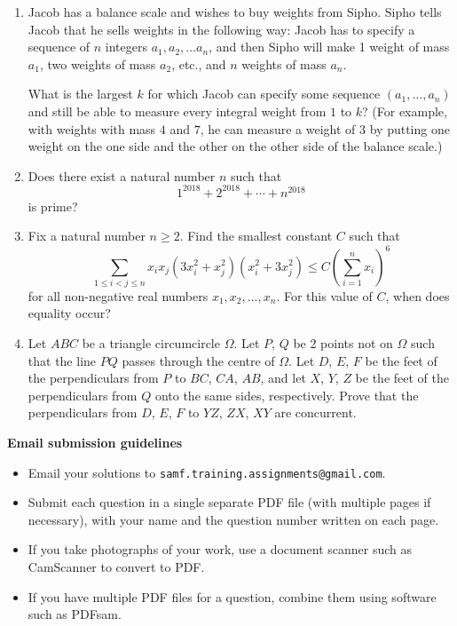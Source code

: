 \documentclass{article}
\begin{document}
\begin{enumerate}[1.]
\vspace{6pt}
\item %
Jacob has a balance scale and wishes to buy weights from Sipho. Sipho tells Jacob that he sells weights in the following way: Jacob has to specify a sequence of $n$ integers $a_1, a_2, \dotsc a_n$, and then Sipho will make 1 weight of mass $a_1$, two weights of mass $a_2$, etc., and $n$ weights of mass $a_n$.

What is the largest $k$ for which Jacob can specify some sequence $(a_1, \dotsc, a_n)$ and still be able to measure every integral weight from $1$ to $k$? (For example, with weights with mass $4$ and $7$, he can measure a weight of $3$ by putting one weight on the one side and the other on the other side of the balance scale.)


\vspace{6pt}
\item
Does there exist a natural number $n$ such that
\[
	1^{2018} + 2^{2018} + \cdots + n^{2018}
\]
is prime?


\vspace{6pt}
\item %
Fix a natural number $n \geq 2$. Find the smallest constant $C$ such that
\[
	 \sum_{1 \leq i < j \leq n} x_i x_j (3x_i^2 + x_j^2)(x_i^2 + 3x_j^2) \leq C {\left( \sum_{i = 1}^{n} x_i \right)}^6
\]
for all non-negative real numbers $x_1, x_2, \dots, x_n$. For this value of $C$, when does equality occur?


\item Let $ABC$ be a triangle circumcircle $\Omega$. Let $P$, $Q$ be 2 points not on $\Omega$ such that the line $PQ$ passes through the centre of $\Omega$. Let $D$, $E$, $F$ be the feet of the perpendiculars from $P$ to $BC$, $CA$, $AB$, and let $X$, $Y$, $Z$ be the feet of the perpendiculars from $Q$ onto the same sides, respectively. Prove that the perpendiculars from $D$, $E$, $F$ to $YZ$, $ZX$, $XY$ are concurrent.

\end{enumerate}


\vfill
\textbf{\Large Email submission guidelines}
\begin{itemize}
	\item Email your solutions to \verb!samf.training.assignments@gmail.com!.
	\item Submit each question in a single separate PDF file (with multiple pages if necessary), with your name and the question number written on each page.
	\item If you take photographs of your work, use a document scanner such as CamScanner to convert to PDF.
	\item If you have multiple PDF files for a question, combine them using software such as PDFsam.
\end{itemize}
\end{document}
